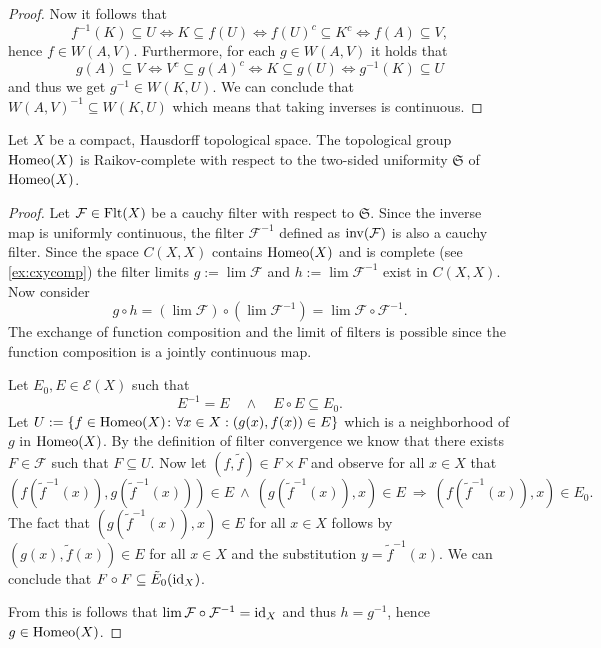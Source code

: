 \begin{proof}
  Now it follows that
  \begin{equation*}
    f^{-1}(K)  \subseteq U \iff K \subseteq f(U) \iff f(U)^c \subseteq K^c \iff f(A) \subseteq V, 
  \end{equation*}
  hence $f\in W(A, V)$. Furthermore, for each $g\in W(A, V)$ it holds that
  \begin{equation*}
    g(A) \subseteq V \iff V^c \subseteq g(A)^c \iff K \subseteq g(U) \iff g^{-1}(K) \subseteq U
  \end{equation*}
  and thus we get $g^{-1} \in W(K, U)$.
  We can conclude that $W(A, V)^{-1} \subseteq W(K, U)$ which means that taking inverses is continuous.
\end{proof}

\begin{thm}\label{thm:homeocomp}
  Let $X$ be a compact, Hausdorff topological space. The topological group ${\rm Homeo}(X)$ is Raikov-complete with respect to the two-sided uniformity $\mathfrak{S}$ of ${\rm Homeo}(X)$. 
\end{thm}

\begin{proof}
  Let $\mathcal{F} \in {\rm Flt}(X)$ be a cauchy filter with respect to $\mathfrak{S}$. Since the inverse map is uniformly continuous, the filter $\mathcal{F}^{-1}$ defined as ${\rm inv}(\mathcal{F})$ is also a cauchy filter. Since the space $C(X, X)$ contains ${\rm Homeo}(X)$ and is complete (see \ref{ex:cxycomp}) the filter limits $g := \lim \mathcal{F}$ and $h := \lim \mathcal{F}^{-1}$ exist in $C(X,X)$. Now consider $$ g \circ h = (\lim \mathcal{F}) \circ (\lim \mathcal{F}^{-1}) = \lim {\mathcal{F} \circ \mathcal{F}^{-1}}. $$ The exchange of function composition and the limit of filters is possible since the function composition is a jointly continuous map.

  Let $E_0, E \in \mathcal{E}(X)$ such that $$ E^{-1} = E \quad \land \quad E \circ E \subseteq E_0.$$ Let $U := \{f \in {\rm Homeo}(X)\colon \forall x \in X: (g(x), f(x)) \in E\}$ which is a neighborhood of $g$ in ${\rm Homeo}(X)$. By the definition of filter convergence we know that there exists $F \in \mathcal{F}$ such that $F \subseteq U$. Now let $(f, \tilde{f}) \in F \times F$ and observe for all $x \in X$ that $$ \left(f(\tilde{f}^{-1}(x)), g(\tilde{f}^{-1}(x))\right) \in E \: \land \: \left(g(\tilde{f}^{-1}(x)), x\right) \in E \: \Rightarrow \: \left(f(\tilde{f}^{-1}(x)), x\right) \in E_0.$$ The fact that $\left(g(\tilde{f}^{-1}(x)), x\right) \in E$ for all $x \in X$ follows by $\left(g(x), \tilde{f}(x)\right) \in E$ for all $x \in X$ and the substitution $y = \tilde{f}^{-1}(x)$. We can conclude that $F \circ F \subseteq \tilde{E}_0({\rm id}_X)$. 

  From this is follows that $\lim \mathcal{F} \circ \mathcal{F}^{-1} = {\rm id}_X$ and thus $h = g^{-1}$, hence $g \in {\rm Homeo}(X)$.
\end{proof}


